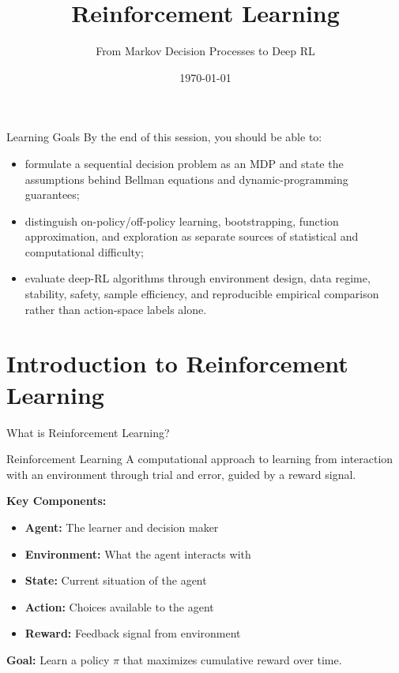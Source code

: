 \documentclass[aspectratio=169]{beamer}
\title{Reinforcement Learning}
\subtitle{From Markov Decision Processes to Deep RL}
\date{\today}
\begin{document}
\begin{frame}
  \titlepage
\end{frame}

\begin{frame}{Learning Goals}
  By the end of this session, you should be able to:
  \begin{itemize}
    \item formulate a sequential decision problem as an MDP and state the assumptions behind Bellman equations and dynamic-programming guarantees;
    \item distinguish on-policy/off-policy learning, bootstrapping, function approximation, and exploration as separate sources of statistical and computational difficulty;
    \item evaluate deep-RL algorithms through environment design, data regime, stability, safety, sample efficiency, and reproducible empirical comparison rather than action-space labels alone.
  \end{itemize}
\end{frame}

\tocslide

\section{Introduction to Reinforcement Learning}

\begin{frame}{What is Reinforcement Learning?}
  \begin{definitionbox}{Reinforcement Learning}
    A computational approach to learning from interaction with an environment through trial and error, guided by a reward signal.
  \end{definitionbox}

  \vspace{0.5em}

  \textbf{Key Components:}
  \begin{itemize}
    \item \textbf{Agent:} The learner and decision maker
    \item \textbf{Environment:} What the agent interacts with
    \item \textbf{State:} Current situation of the agent
    \item \textbf{Action:} Choices available to the agent
    \item \textbf{Reward:} Feedback signal from environment
  \end{itemize}

  \vspace{0.5em}

  \textbf{Goal:} Learn a \alert{policy} $\pi$ that maximizes cumulative reward over time.
\end{frame}
\end{document}

